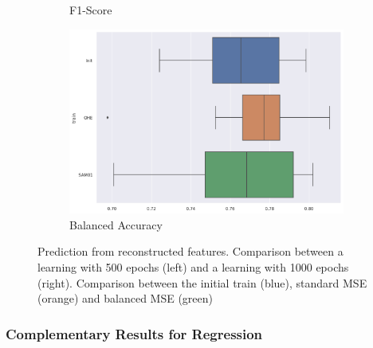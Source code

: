 \documentclass{article}
\theoremstyle{definition}
\begin{document}
\begin{figure}[H]
\begin{subfigure}[b]{0.24\textwidth}
         \caption{F1-Score}
         \quad
         \includegraphics[width=\textwidth]{imgs/BreastCancer/Bal/Boxplot_BACC.png}
         \caption{Balanced Accuracy}
         \label{Prediction_BreastCancer_Bal2}
     \end{subfigure}
     \caption{Prediction from reconstructed features. Comparison between a learning with 500 epochs (left) and a learning with 1000 epochs (right). Comparison between the initial train (blue), standard MSE (orange) and balanced MSE (green)}
     \label{Prediction_BreastCancer2}
\end{figure}



\newpage
\subsubsection{Complementary Results for Regression}
\label{Prediction_Regression_Details}
\end{document}
